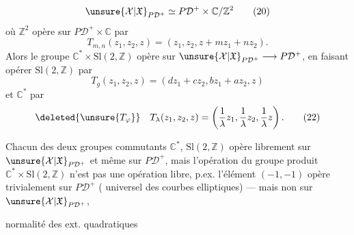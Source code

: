 \[
\unsure{\mathcal X|\mathfrak X}_{P\mathcal D^+}\simeq P\mathcal D^+\times\mathbb C/\mathbb Z^2
\tag{20}
\]
où $\mathbb Z^2$ opère sur $P\mathcal D^+\times\mathbb C$ par
\[
T_{m,n}(z_1,z_2,z)=(z_1,z_2,z+mz_1+nz_2).
\]
Alors le groupe $\mathbb C^*\times\mathrm{Sl}(2,\mathbb Z)$ opère sur
$\unsure{\mathcal X|\mathfrak X}_{P\mathcal D^+}\longrightarrow P\mathcal D^+$, en faisant opérer $\mathrm{Sl}(2,\mathbb Z)$
par
\[
T_g(z_1,z_2,z)=(dz_1+cz_2,bz_1+az_2,z)
\tag{21}
\]
et $\mathbb C^*$  par
\[
\deleted{\unsure{T_\varphi}}\quad
T_\lambda(z_1,z_2,z)=\left(\frac1\lambda z_1,\frac1\lambda z_2,\frac1\lambda z\right).
\tag{22}
\]

Chacun des deux groupes commutants
$\mathbb C^*$, $\mathrm{Sl}(2,\mathbb Z)$ opère librement sur $\unsure{\mathcal X|\mathfrak X}_{P\mathcal D^+}$ et
même sur $P\mathcal D^+$, mais l'opération du
groupe produit $\mathbb C^*\times\mathrm{Sl}(2,\mathbb Z)$  n'est pas
une opération libre, p.ex. l'élément
$(-1,-1)$ opère trivialement sur $P\mathcal D^+$
( universel des courbes elliptiques)
--- mais non sur $\unsure{\mathcal X|\mathfrak X}_{P\mathcal D^+}$,

normalité des ext. quadratiques

